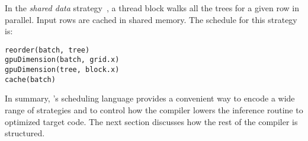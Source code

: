 In the \emph{shared data} strategy~\cite{Tahoe}, a thread block walks all the trees 
for a given row in parallel. Input rows are cached in shared memory.
The schedule for this strategy is:
\begin{lstlisting}[style=c++]
reorder(batch, tree)
gpuDimension(batch, grid.x)
gpuDimension(tree, block.x)
cache(batch)
\end{lstlisting}
  



In summary, \Treebeard{}'s scheduling language provides a convenient way to
encode a wide range of strategies and to control how the compiler lowers 
the inference routine to optimized target code. The next section 
discusses how the rest of the compiler is structured. 